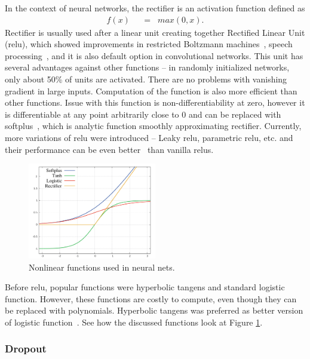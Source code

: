 In the context of neural networks, the rectifier is an activation function defined as
\begin{align}
f(x) \hspace{7pt}&=\hspace{7pt} max(0,x). \label{eq:rectifier}
\end{align}
Rectifier is usually used after a linear unit creating together Rectified Linear Unit (\gls{relu}), which showed improvements in restricted Boltzmann machines~\cite{DBLP:conf/icml/NairH10}, speech processing~\cite{zeiler2013rectified}, and it is also default option in convolutional networks. This unit has several advantages against other functions -- in randomly initialized networks, only about 50\% of units are activated. There are no problems with vanishing gradient in large inputs. Computation of the function is also more efficient than other functions. Issue with this function is non-differentiability at zero, however it is differentiable at any point arbitrarily close to 0 and can be replaced with softplus~\cite{dugas2001incorporating}, which is analytic function smoothly approximating rectifier. Currently, more variations of \gls{relu} were introduced -- Leaky \gls{relu}, parametric \gls{relu}, etc. and their performance can be even better~\cite{DBLP:journals/corr/XuWCL15} than vanilla \gls{relu}s.

\begin{figure}[!t]
	\centering
	\includegraphics[width=0.5\textwidth]{fig/nonlinearities.pdf}
	\caption{Nonlinear functions used in neural nets.
		\label{fig:nonlinear}}
\end{figure}
Before \gls{relu}, popular functions were hyperbolic tangens and standard logistic function. However, these functions are costly to compute, even though they can be replaced with polynomials. Hyperbolic tangens was preferred as better version of logistic function~\cite{lecun2012efficient}. See how the discussed functions look at Figure \ref{fig:nonlinear}.

\subsubsection{Dropout}

